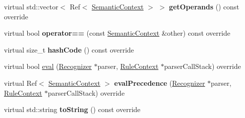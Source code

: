 \begin{DoxyCompactItemize}
\item 
\mbox{\label{classantlr4_1_1atn_1_1SemanticContext_ab1584465b3b88d7f75f030a24482fd13}} 
virtual std\+::vector$<$ Ref$<$ \hyperlink{classantlr4_1_1atn_1_1SemanticContext}{Semantic\+Context} $>$ $>$ {\bfseries get\+Operands} () const override
\item 
\mbox{\label{classantlr4_1_1atn_1_1SemanticContext_a1400e1ca84faec671a3756ff0b9f4734}} 
virtual bool {\bfseries operator==} (const \hyperlink{classantlr4_1_1atn_1_1SemanticContext}{Semantic\+Context} \&other) const override
\item 
\mbox{\label{classantlr4_1_1atn_1_1SemanticContext_a82a09a52cfc8030b1c33f1eaadad539a}} 
virtual size\+\_\+t {\bfseries hash\+Code} () const override
\item 
virtual bool \hyperlink{classantlr4_1_1atn_1_1SemanticContext_aaf020c5b73a8d0216f8423acd5d4cea8}{eval} (\hyperlink{classantlr4_1_1Recognizer}{Recognizer} $\ast$parser, \hyperlink{classantlr4_1_1RuleContext}{Rule\+Context} $\ast$parser\+Call\+Stack) override
\item 
\mbox{\label{classantlr4_1_1atn_1_1SemanticContext_a813c90739c89d03f17bf38ae5cbaa3dc}} 
virtual Ref$<$ \hyperlink{classantlr4_1_1atn_1_1SemanticContext}{Semantic\+Context} $>$ {\bfseries eval\+Precedence} (\hyperlink{classantlr4_1_1Recognizer}{Recognizer} $\ast$parser, \hyperlink{classantlr4_1_1RuleContext}{Rule\+Context} $\ast$parser\+Call\+Stack) override
\item 
\mbox{\label{classantlr4_1_1atn_1_1SemanticContext_a2a712638848af9bc2c996bda844eb15b}} 
virtual std\+::string {\bfseries to\+String} () const override
\end{DoxyCompactItemize}
